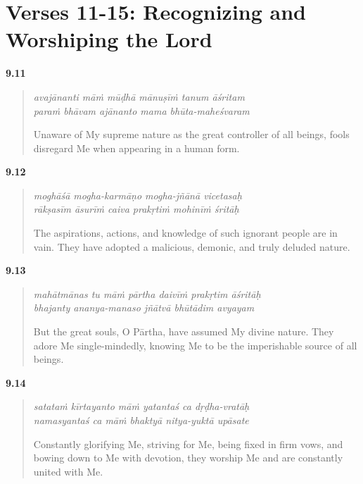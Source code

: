 \newpage

\section{Verses 11-15: Recognizing and Worshiping the Lord}\label{sec-verses-11-15-recognizing-and-worshiping-the-lord}


\par\noindent\textbf{9.11}\par
\begin{verse}
\textit{avajānanti māṁ mūḍhā mānuṣīṁ tanum āśritam} \\
\textit{paraṁ bhāvam ajānanto mama bhūta-maheśvaram}

\noindent Unaware of My supreme nature as the great controller of all beings, fools disregard Me when appearing in a human form.
\end{verse}
\par



\par\noindent\textbf{9.12}\par
\begin{verse}
\textit{moghāśā mogha-karmāṇo mogha-jñānā vicetasaḥ} \\
\textit{rākṣasīm āsurīṁ caiva prakṛtiṁ mohinīṁ śritāḥ}

\noindent The aspirations, actions, and knowledge of such ignorant people are in vain. They have adopted a malicious, demonic, and truly deluded nature.
\end{verse}
\par



\par\noindent\textbf{9.13}\par
\begin{verse}
\textit{mahātmānas tu māṁ pārtha daivīṁ prakṛtim āśritāḥ} \\
\textit{bhajanty ananya-manaso jñātvā bhūtādim avyayam}

\noindent But the great souls, O Pārtha, have assumed My divine nature. They adore Me single-mindedly, knowing Me to be the imperishable source of all beings.
\end{verse}
\par



\par\noindent\textbf{9.14}\par
\begin{verse}
\textit{satataṁ kīrtayanto māṁ yatantaś ca dṛḍha-vratāḥ} \\
\textit{namasyantaś ca māṁ bhaktyā nitya-yuktā upāsate}

\noindent Constantly glorifying Me, striving for Me, being fixed in firm vows, and bowing down to Me with devotion, they worship Me and are constantly united with Me.
\end{verse}
\par



